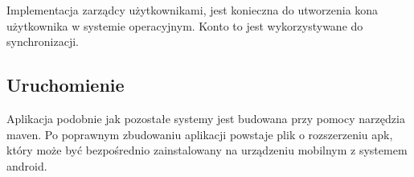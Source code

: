 Implementacja zarządcy użytkownikami, jest konieczna do utworzenia kona użytkownika w systemie operacyjnym. Konto to jest wykorzystywane do synchronizacji. 

\subsection{Uruchomienie}

Aplikacja podobnie jak pozostałe systemy jest budowana przy pomocy narzędzia maven. Po poprawnym zbudowaniu aplikacji powstaje plik o rozszerzeniu apk, który może być bezpośrednio zainstalowany na urządzeniu mobilnym z systemem android.

